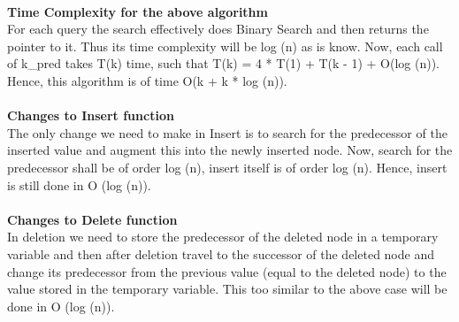 \documentclass[a4paper,11pt]{article}
\theoremstyle{mytheor}
\begin{document}
\\
\textbf{Time Complexity for the above algorithm}\\
For each query the search effectively does Binary Search and then returns the pointer to it. Thus its time complexity will be log (n) as is know. Now, each call of k\_pred takes T(k) time, such that T(k) = 4 * T(1) + T(k - 1) + O(log (n)).
Hence, this algorithm is of \quad time O(k + k * log (n)).\\
\\
\textbf{Changes to Insert function}\\
The only change we need to make in Insert is to search for the predecessor of the inserted value and augment this into the newly inserted node. Now, search for the predecessor shall be of order log (n), insert itself is of order log (n). Hence, insert is still done in O (log (n)).\\
\\
\textbf{Changes to Delete function}\\
In deletion we need to store the predecessor of the deleted node in a temporary variable and then after deletion travel to the successor of the deleted node and change its predecessor from the previous value (equal to the deleted node) to the value stored in the temporary variable.
This too similar to the above case will be done in O (log (n)).
\end{document}
